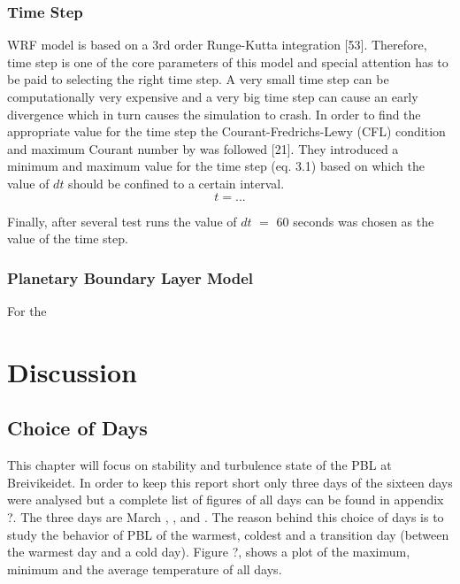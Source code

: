 \documentclass[a4paper,12pt]{article}
\numberwithin{equation}{section} %
\begin{document}
\subsubsection{Time Step}
WRF model is based on a 3rd order Runge-Kutta integration [53]. Therefore, time step is one of the core parameters of this model and special attention has to be paid to selecting the right time step. A very small time step can be computationally very expensive and a very big time step can cause an early divergence which in turn causes the simulation to crash. In order to find the appropriate value for the time step the Courant-Fredrichs-Lewy (CFL) condition and maximum Courant number by  was followed [21]. They introduced a minimum and maximum value for the time step (eq. 3.1) based on which the value of $dt$ should be confined to a certain interval.
\vspace{0.25cm}
\begin{equation}
t = ...
\end{equation}

\vspace{0.25cm}

Finally, after several test runs the value of $dt$ $=$ $60$ seconds was chosen as the value of the time step.

\subsubsection{Planetary Boundary Layer Model}

For the 

\newpage

\section{Discussion}

\subsection{Choice of Days}
This chapter will focus on stability and turbulence state of the PBL at Breivikeidet. In order to keep this report short only three days of the sixteen days were analysed but a complete list of figures of all days can be found in appendix ?. The three days are March , , and . The reason behind this choice of days is to study the behavior of PBL of the warmest, coldest and a transition day (between the warmest day and a cold day). Figure ?, shows a plot of the maximum, minimum and the average temperature of all days.
\end{document}
